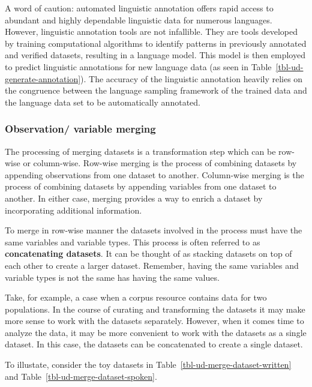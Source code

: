 \documentclass[
  letterpaper,
  DIV=11,
  numbers=noendperiod]{scrreport}
\theoremstyle{definition}
\theoremstyle{remark}
\begin{document}
A word of caution: automated linguistic annotation offers rapid access
to abundant and highly dependable linguistic data for numerous
languages. However, linguistic annotation tools are not infallible. They
are tools developed by training computational algorithms to identify
patterns in previously annotated and verified datasets, resulting in a
language model. This model is then employed to predict linguistic
annotations for new language data (as seen in
Table~\ref{tbl-ud-generate-annotation}). The accuracy of the linguistic
annotation heavily relies on the congruence between the language
sampling framework of the trained data and the language data set to be
automatically annotated.

\hypertarget{sec-ud-obs-variable-merging}{%
\subsubsection{Observation/ variable
merging}\label{sec-ud-obs-variable-merging}}

The processing of merging datasets is a transformation step which can be
row-wise or column-wise. Row-wise merging is the process of combining
datasets by appending observations from one dataset to another.
Column-wise merging is the process of combining datasets by appending
variables from one dataset to another. In either case, merging provides
a way to enrich a dataset by incorporating additional information.

To merge in row-wise manner the datasets involved in the process must
have the same variables and variable types. This process is often
referred to as \textbf{concatenating datasets}. It can be thought of as
stacking datasets on top of each other to create a larger dataset.
Remember, having the same variables and variable types is not the same
has having the same values.

Take, for example, a case when a corpus resource contains data for two
populations. In the course of curating and transforming the datasets it
may make more sense to work with the datasets separately. However, when
it comes time to analyze the data, it may be more convenient to work
with the datasets as a single dataset. In this case, the datasets can be
concatenated to create a single dataset.

To illustate, consider the toy datasets in
Table~\ref{tbl-ud-merge-dataset-written} and
Table~\ref{tbl-ud-merge-dataset-spoken}.
\end{document}
